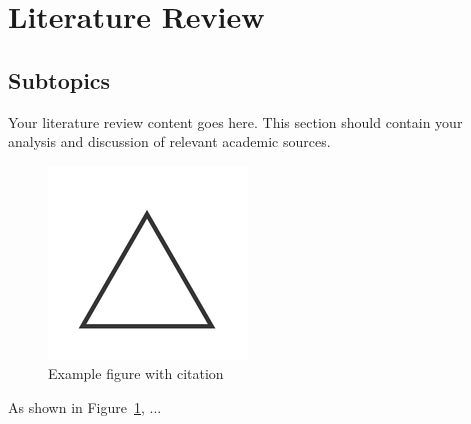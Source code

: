 \section{Literature Review}
\subsection{Subtopics}

Your literature review content goes here. This section should contain your analysis and discussion of relevant academic sources.


\begin{figure}[H]
    \centering
    \includegraphics[width=0.2\linewidth]{assets/example.png}
    \caption{Example figure with citation\protect{}}
    \label{fig:example}
\end{figure}

As shown in Figure~\ref{fig:example}, ...


